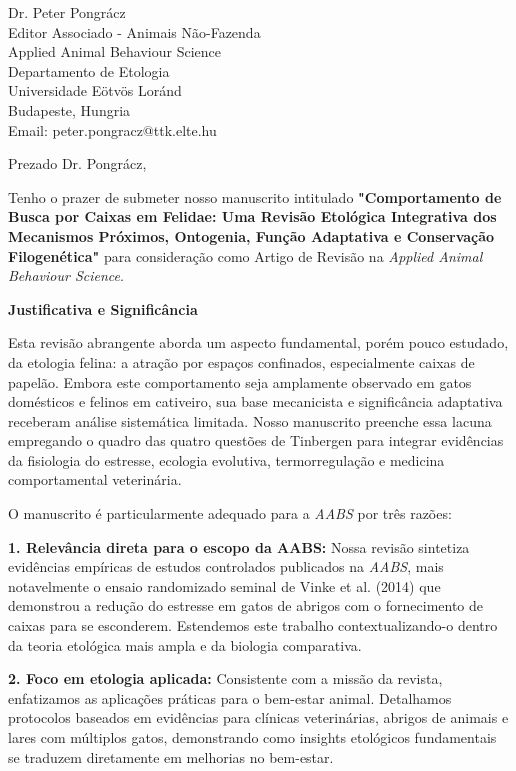 \documentclass[11pt]{letter}
\begin{document}
\begin{letter}{
Dr. Peter Pongrácz\\
Editor Associado - Animais Não-Fazenda\\
Applied Animal Behaviour Science\\
Departamento de Etologia\\
Universidade Eötvös Loránd\\
Budapeste, Hungria\\
Email: peter.pongracz@ttk.elte.hu
}

\opening{Prezado Dr. Pongrácz,}

Tenho o prazer de submeter nosso manuscrito intitulado \textbf{"Comportamento de Busca por Caixas em Felidae: Uma Revisão Etológica Integrativa dos Mecanismos Próximos, Ontogenia, Função Adaptativa e Conservação Filogenética"} para consideração como Artigo de Revisão na \textit{Applied Animal Behaviour Science}.

\textbf{Justificativa e Significância}

Esta revisão abrangente aborda um aspecto fundamental, porém pouco estudado, da etologia felina: a atração por espaços confinados, especialmente caixas de papelão. Embora este comportamento seja amplamente observado em gatos domésticos e felinos em cativeiro, sua base mecanicista e significância adaptativa receberam análise sistemática limitada. Nosso manuscrito preenche essa lacuna empregando o quadro das quatro questões de Tinbergen para integrar evidências da fisiologia do estresse, ecologia evolutiva, termorregulação e medicina comportamental veterinária.

O manuscrito é particularmente adequado para a \textit{AABS} por três razões:

\textbf{1. Relevância direta para o escopo da AABS:} Nossa revisão sintetiza evidências empíricas de estudos controlados publicados na \textit{AABS}, mais notavelmente o ensaio randomizado seminal de Vinke et al. (2014) que demonstrou a redução do estresse em gatos de abrigos com o fornecimento de caixas para se esconderem. Estendemos este trabalho contextualizando-o dentro da teoria etológica mais ampla e da biologia comparativa.

\textbf{2. Foco em etologia aplicada:} Consistente com a missão da revista, enfatizamos as aplicações práticas para o bem-estar animal. Detalhamos protocolos baseados em evidências para clínicas veterinárias, abrigos de animais e lares com múltiplos gatos, demonstrando como insights etológicos fundamentais se traduzem diretamente em melhorias no bem-estar.


\end{letter}
\end{document}
